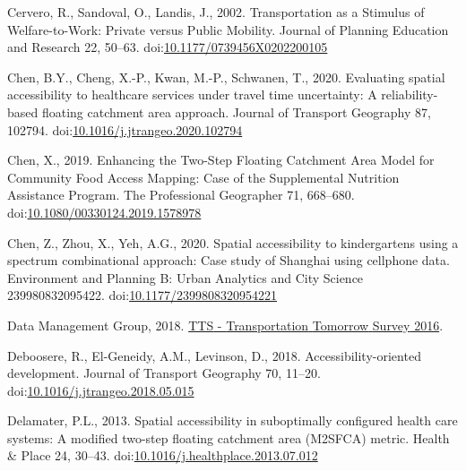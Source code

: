 \documentclass[]{elsarticle} %
\newlength{\cslhangindent}
\newlength{\cslentryspacingunit} %
\newenvironment{CSLReferences}[2] %
 {%
  \setlength{\parindent}{0pt}
  \ifodd #1
  \let\oldpar\par
  \def\par{\hangindent=\cslhangindent\oldpar}
  \fi
  \setlength{\parskip}{#2\cslentryspacingunit}
 }%
 {}
\begin{document}
\begin{CSLReferences}{1}{0}
\leavevmode{}%
Cervero, R., Sandoval, O., Landis, J., 2002. Transportation as a
{Stimulus} of {Welfare}-to-{Work}: {Private} versus {Public} {Mobility}.
Journal of Planning Education and Research 22, 50--63.
doi:\href{https://doi.org/10.1177/0739456X0202200105}{10.1177/0739456X0202200105}

\leavevmode{}%
Chen, B.Y., Cheng, X.-P., Kwan, M.-P., Schwanen, T., 2020. Evaluating
spatial accessibility to healthcare services under travel time
uncertainty: {A} reliability-based floating catchment area approach.
Journal of Transport Geography 87, 102794.
doi:\href{https://doi.org/10.1016/j.jtrangeo.2020.102794}{10.1016/j.jtrangeo.2020.102794}

\leavevmode{}%
Chen, X., 2019. Enhancing the {Two}-{Step} {Floating} {Catchment} {Area}
{Model} for {Community} {Food} {Access} {Mapping}: {Case} of the
{Supplemental} {Nutrition} {Assistance} {Program}. The Professional
Geographer 71, 668--680.
doi:\href{https://doi.org/10.1080/00330124.2019.1578978}{10.1080/00330124.2019.1578978}

\leavevmode{}%
Chen, Z., Zhou, X., Yeh, A.G., 2020. Spatial accessibility to
kindergartens using a spectrum combinational approach: {Case} study of
{Shanghai} using cellphone data. Environment and Planning B: Urban
Analytics and City Science 239980832095422.
doi:\href{https://doi.org/10.1177/2399808320954221}{10.1177/2399808320954221}

\leavevmode{}%
Data Management Group, 2018.
\href{http://dmg.utoronto.ca/transportation-tomorrow-survey/tts-introduction}{{TTS}
- {Transportation} {Tomorrow} {Survey} 2016}.

\leavevmode{}%
Deboosere, R., El-Geneidy, A.M., Levinson, D., 2018.
Accessibility-oriented development. Journal of Transport Geography 70,
11--20.
doi:\href{https://doi.org/10.1016/j.jtrangeo.2018.05.015}{10.1016/j.jtrangeo.2018.05.015}

\leavevmode{}%
Delamater, P.L., 2013. Spatial accessibility in suboptimally configured
health care systems: A modified two-step floating catchment area
(M2SFCA) metric. Health \& Place 24, 30--43.
doi:\href{https://doi.org/10.1016/j.healthplace.2013.07.012}{10.1016/j.healthplace.2013.07.012}


\end{CSLReferences}
\end{document}
